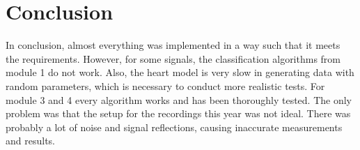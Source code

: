 \chapter{Conclusion}
In conclusion, almost everything was implemented in a way such that it meets the requirements. However, for some signals, the classification algorithms from module 1 do not work. Also, the heart model is very slow in generating data with random parameters, which is necessary to conduct more realistic tests. 
For module 3 and 4 every algorithm works and has been thoroughly tested. The only problem was that the setup for the recordings this year was not ideal. There was probably a lot of noise and signal reflections, causing inaccurate measurements and results.